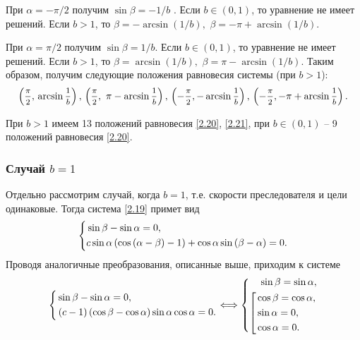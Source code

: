 \documentclass[a4paper,12pt, openany]{book}
\theoremstyle{plain} %
\theoremstyle{definition} %
\theoremstyle{remark} %
\numberwithin{equation}{chapter}
\begin{document}
{При $\alpha = -\pi/2$ получим $\sin\beta = -1/b$ . Если $b\in(0,1)$, то уравнение не имеет решений. Если $b>1$, то $
\beta  =  - \arcsin \left( {1/b} \right),\,\,\beta  =  - \pi  + \arcsin \left( {1/b} \right).
$

При $\alpha = \pi/2$ получим $\sin\beta = 1/b$. Если $b\in(0,1)$, то уравнение не имеет решений. Если $b>1$, то $
\beta  = \arcsin \left( {1/b} \right),\,\,\beta  = \pi  - \arcsin \left( {1/b} \right)
$. Таким образом, получим следующие положения равновесия системы (при $b>1$):
\begin{equation}\label{2.21}
\left( {\mfrac{\pi }{2},\,\arcsin \mfrac{1}{b}} \right),\,\left( {\mfrac{\pi }{2},\,\,\pi  - \arcsin \mfrac{1}{b}} \right),\,\left( { - \mfrac{\pi }{2}, - \arcsin \mfrac{1}{b}} \right),\,\left( { - \mfrac{\pi }{2}, - \pi  + \arcsin \mfrac{1}{b}} \right).
\end{equation}

При $b>1$ имеем 13 положений равновесия \eqref{2.20}, \eqref{2.21}, при $b\in(0,1)$ -- 9 положений равновесия \eqref{2.20}. 

\subsubsection*{Случай $b = 1$}


Отдельно рассмотрим случай, когда $b=1$, т.е. скорости преследователя и цели одинаковые. Тогда система \eqref{2.19} примет вид
\begin{equation}\label{2.22}
\left\{ {\begin{aligned}
   & \sin \beta  - \sin \alpha  = 0, \hfill  \\
   & c\sin \alpha \left( {\cos \left( {\alpha  - \beta } \right) - 1} \right) + \cos \alpha \sin \left( {\beta  - \alpha } \right) = 0. \hfill  \\
\end{aligned}} \right.
\end{equation}
Проводя аналогичные преобразования, описанные выше, приходим к системе
\begin{equation}\label{2.23}
\left\{ {\begin{aligned}
   &\sin \beta  - \sin \alpha  = 0, \hfill  \\
   &\left( {c - 1} \right)\left( {\cos \beta  - \cos \alpha } \right)\sin \alpha \cos \alpha  = 0. \hfill  \\
\end{aligned}} \right. \Longleftrightarrow \left\{ {\begin{aligned}
   \sin \beta  = \sin \alpha , \hfill  \\
   {\left[ {\begin{aligned}
   &\cos \beta  = \cos \alpha , \hfill  \\
   &\sin \alpha  = 0, \hfill  \\
   &\cos \alpha  = 0. \hfill  \\
\end{aligned}} \right.} \hfill  \\
\end{aligned}} \right.
\end{equation}

}
\end{document}
